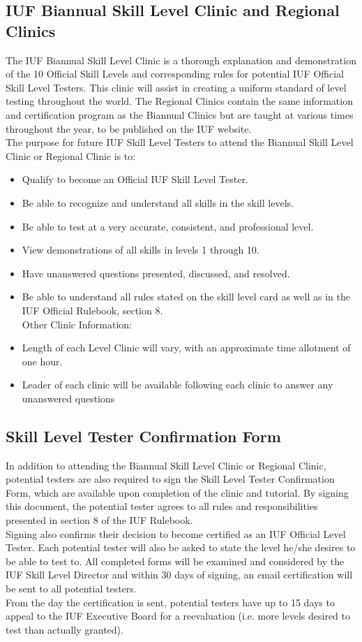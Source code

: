\subsection{ IUF Biannual Skill Level Clinic and Regional Clinics}
The IUF Biannual Skill Level Clinic is a thorough explanation and demonstration of the 10 Official Skill Levels and
corresponding rules for potential IUF Official Skill Level Testers. This clinic will assist in creating a uniform standard
of level testing throughout the world. The Regional Clinics contain the same information and certification program as
the Biannual Clinics but are taught at various times throughout the year, to be published on the IUF website.\\
The purpose for future IUF Skill Level Testers to attend the Biannual Skill Level Clinic or Regional Clinic is to:\\
\begin{itemize}
\item Qualify to become an Official IUF Skill Level Tester.
\item Be able to recognize and understand all skills in the skill levels.
\item Be able to test at a very accurate, consistent, and professional level.
\item View demonstrations of all skills in levels 1 through 10.
\item Have unanswered questions presented, discussed, and resolved.
\item Be able to understand all rules stated on the skill level card as well as in the IUF Official Rulebook, section 8.\\
Other Clinic Information:
\item Length of each Level Clinic will vary, with an approximate time allotment of one hour.
\item Leader of each clinic will be available following each clinic to answer any unanswered questions
\end{itemize}


\subsection{ Skill Level Tester Confirmation Form}
In addition to attending the Biannual Skill Level Clinic or Regional Clinic, potential testers are also required to sign the
Skill Level Tester Confirmation Form, which are available upon completion of the clinic and tutorial. By signing this
document, the potential tester agrees to all rules and responsibilities presented in section 8 of the IUF Rulebook.\\
Signing also confirms their decision to become certified as an IUF Official Level Tester. Each potential tester will also
be asked to state the level he/she desires to be able to test to. All completed forms will be examined and considered by
the IUF Skill Level Director and within 30 days of signing, an email certification will be sent to all potential testers.\\
From the day the certification is sent, potential testers have up to 15 days to appeal to the IUF Executive Board for a
reevaluation (i.e. more levels desired to test than actually granted).

